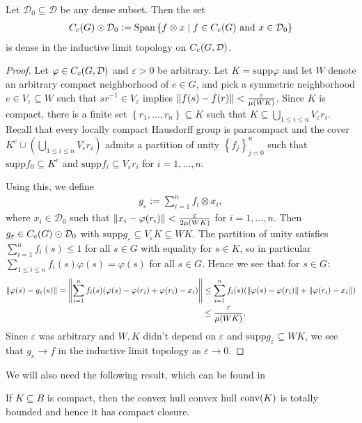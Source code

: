 \begin{lemma}
Let $\mathcal{D}_0 \subseteq \mathcal{D}$ be any dense subset. Then the set
\begin{align*}
	C_c(G) \odot \mathcal{D}_0 := \mathrm{Span}\left\{ f \otimes x \mid f \in C_c(G) \text{ and } x \in \mathcal{D}_0 \right\} 
\end{align*}
is dense in the inductive limit topology on $C_c(G,\mathcal{D})$.
	\label{int:indlmdense}
\end{lemma}
\begin{proof}	
	Let $\varphi \in C_c(G,\mathcal{D})$ and $\varepsilon > 0$ be arbitrary. Let $K= \mathrm{supp} \varphi$ and let $W$ denote an arbitrary compact neighborhood of $e \in G$, and pick a symmetric neighborhood $e \in V_{\varepsilon} \subseteq W$ such that $sr^{-1} \in V_\varepsilon$ implies $\left\lVert f(s) - f(r) \right\rVert < \frac{\varepsilon}{\mu(WK)}$. Since $K$ is compact, there is a finite set $\left\{ r_1,\dots,r_n \right\} \subseteq K$ such that $K \subseteq \bigcup_{1 \leq i \leq n} V_\varepsilon r_i$. Recall that every locally compact Hausdorff group is paracompact and the cover $K^c \cup \left( \bigcup_{1 \leq i \leq n } V_\varepsilon r_i \right)$ admits a partition of unity $\left\{ f_j \right\}_{j=0}^n$ such that $\mathrm{supp}f_0 \subseteq K^c$ and $\mathrm{supp}f_i \subseteq V_\varepsilon r_i$ for $i = 1 ,\dots,n$. 
	
	Using this, we define
	\begin{align*}
		g_\varepsilon := \sum_{i=1}^n f_i \otimes x_i,
	\end{align*}
	where $x_i \in \mathcal{D}_0$ such that $\left\lVert x_i - \varphi(r_i)\right\rVert < \frac{\varepsilon}{2\mu(WK)}$ for $i = 1,\dots,n$. Then $g_\varepsilon \in C_c(G) \odot \mathcal{D}_0$ with $\mathrm{supp} g_\varepsilon \subseteq V_\varepsilon K \subseteq W K$. The partition of unity satisfies $\sum_{i=1}^n f_i(s) \leq 1$ for all $s \in G$ with equality for $s \in K$, so in particular $\sum_{1 \leq i \leq n}f_i(s) \varphi(s) = \varphi(s)$ for all $s \in G$. Hence we see that for $s \in G$: 
	\begin{align*}
		\left\lVert\varphi(s) - g_{\varepsilon}(s)\right\rVert = \left\lVert \sum_{i=1}^n f_i(s)(\varphi(s) - \varphi(r_i)+\varphi(r_i)-x_i)\right\rVert &\leq \sum_{i=1}^n f_i(s) (\left\lVert \varphi(s) - \varphi(r_i)\right\rVert+\left\lVert \varphi(r_i)-x_i\right\rVert) \\
		&\leq \frac{\varepsilon}{\mu(WK)},
	\end{align*}
	Since $\varepsilon$ was arbitrary and $W,K$ didn't depend on $\varepsilon$ and $ \mathrm{supp} g_\varepsilon \subseteq WK$, we see that $g_\varepsilon \to f$ in the inductive limit topology as $\varepsilon \to 0$.
\end{proof}
We will also need the following result, which can be found in \cite[Theorem 3.20, part (b, c)]{rudin1991functional}
\begin{lemma}
	If $K \subseteq B$ is compact, then the convex hull convex hull $\operatorname{conv}(K)$ is totally bounded and hence it has compact closure.
	\label{int:clconvcomp}
\end{lemma}


